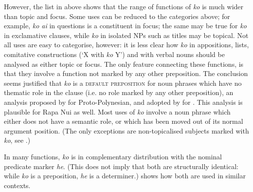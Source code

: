 However, the list in  above shows that the range of functions of \textit{ko} is much wider than topic and focus. Some uses can be reduced to the categories above; for example, \textit{ko ai} in questions is a constituent in focus; the same may be true for \textit{ko} in exclamative clauses, while \textit{ko} in isolated NPs such as titles may be topical. Not all uses are easy to categorise, however: it is less clear how \textit{ko} in appositions, lists, comitative constructions (‘X with \textit{ko} Y’) and with verbal nouns should be analysed as either topic or focus. The only feature connecting these functions, is that they involve a function not marked by any other preposition. The conclusion seems justified that \textit{ko} is a \textsc{default preposition} for noun phrases which have no thematic role in the clause (i.e. no role marked by any other preposition), an analysis proposed by \citet[45]{Clark1976} for Proto-Polynesian, and adopted by \citet{MassamLee2006} for . This analysis is plausible for Rapa Nui as well. Most uses of \textit{ko} involve a noun phrase which either does not have a semantic role, or which has been moved out of its normal argument position. (The only exceptions are non-topicalised subjects marked with \textit{ko}, see .)

In many functions, \textit{ko} is in complementary distribution with the nominal predicate marker \textit{he}. (This does not imply that both are structurally identical: while \textit{ko} is a preposition, \textit{he} is a determiner.)  shows how both are used in similar contexts.


